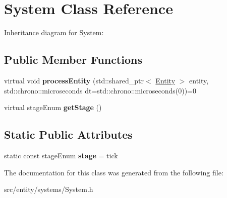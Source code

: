 \hypertarget{classSystem}{\section{System Class Reference}
\label{classSystem}
}


Inheritance diagram for System\-:
\subsection*{Public Member Functions}
\begin{DoxyCompactItemize}
\item 
\hypertarget{classSystem_a3ed896251d22e5580c267419d8bb4c9e}{virtual void {\bfseries process\-Entity} (std\-::shared\-\_\-ptr$<$ \hyperlink{classEntity}{Entity} $>$ entity, std\-::chrono\-::microseconds dt=std\-::chrono\-::microseconds(0))=0}\label{classSystem_a3ed896251d22e5580c267419d8bb4c9e}

\item 
\hypertarget{classSystem_ab782585da2f3ed3a825c174135a97195}{virtual stage\-Enum {\bfseries get\-Stage} ()}\label{classSystem_ab782585da2f3ed3a825c174135a97195}

\end{DoxyCompactItemize}
\subsection*{Static Public Attributes}
\begin{DoxyCompactItemize}
\item 
\hypertarget{classSystem_a618e37d801f081801de4541a81f9d2b8}{static const stage\-Enum {\bfseries stage} = tick}\label{classSystem_a618e37d801f081801de4541a81f9d2b8}

\end{DoxyCompactItemize}


The documentation for this class was generated from the following file\-:\begin{DoxyCompactItemize}
\item 
src/entity/systems/System.\-h\end{DoxyCompactItemize}
